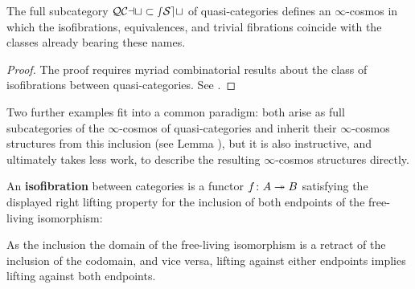 \begin{proposition}\label{prop:qcat-cosmos}
  The full subcategory ${\mathord{\mathcal{QCat}}}\subset{\mathord{\mathcal{sSet}}}$ of quasi-categories defines an $\infty$-cosmos in which the isofibrations, equivalences, and trivial fibrations coincide with the classes  already bearing these names.
\end{proposition}
\begin{proof}
 The proof requires myriad combinatorial results about the class of isofibrations between quasi-categories. See \cite[\S D]{RiehlVerity:2022eo}.
\end{proof}


Two further examples fit into a common paradigm: both arise as full subcategories of the $\infty$-cosmos of quasi-categories and inherit their $\infty$-cosmos structures from this inclusion (see Lemma \cite[6.1.4]{RiehlVerity:2022eo}), but it is also instructive, and ultimately takes less work, to describe the resulting $\infty$-cosmos structures directly.

\begin{definition}\label{defn:cat-isofibration}
An \textbf{isofibration} between categories is a functor $f \colon A \twoheadrightarrow B$ satisfying the displayed right lifting property for the inclusion of both endpoints of the free-living isomorphism:
\begin{center}
  \end{center}
\end{definition}

As the inclusion the domain of the free-living isomorphism is a retract of the inclusion of the codomain, and vice versa, lifting against either endpoints implies lifting against both endpoints.

